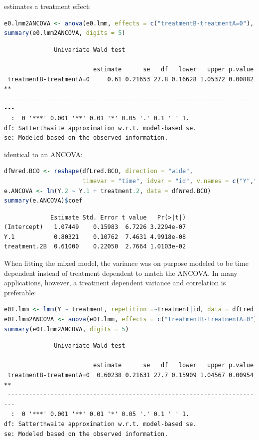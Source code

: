 \documentclass[12pt]{article}
\newcommand\Warning[1][3ex]{%
\renewcommand\stacktype{L}%
\scaleto{\stackon[1.3pt]{\color{red}$\triangle$}{\tiny\bfseries !}}{#1}%
\xspace
}
\begin{document}
estimates a treatment effect:
\begin{lstlisting}[language=r,numbers=none]
e0.lmm2ANCOVA <- anova(e0.lmm, effects = c("treatmentB-treatmentA=0"), multivariate=FALSE)
summary(e0.lmm2ANCOVA, digits = 5)
\end{lstlisting}

\label{}
\begin{verbatim}
              Univariate Wald test 

                         estimate      se   df   lower   upper p.value   
 treatmentB-treatmentA=0     0.61 0.21653 27.8 0.16628 1.05372 0.00882 **
 ------------------------------------------------------------------------ 
  :  0 '***' 0.001 '**' 0.01 '*' 0.05 '.' 0.1 ' ' 1.
df: Satterthwaite approximation w.r.t. model-based se. 
se: Modeled based on the observed information.
\end{verbatim}


identical to an ANCOVA:
\begin{lstlisting}[language=r,numbers=none]
dfWred.BCO <- reshape(dfLred.BCO, direction = "wide",
                      timevar = "time", idvar = "id", v.names = c("Y","treatment"))
e.ANCOVA <- lm(Y.2 ~ Y.1 + treatment.2, data = dfWred.BCO)
summary(e.ANCOVA)$coef
\end{lstlisting}

\label{}
\begin{verbatim}
             Estimate Std. Error t value   Pr(>|t|)
(Intercept)   1.07449    0.15983  6.7226 3.2294e-07
Y.1           0.80321    0.10762  7.4631 4.9918e-08
treatment.2B  0.61000    0.22050  2.7664 1.0103e-02
\end{verbatim}


\Warning When fitting the mixed model, the variance was on purpose
modeled to be time dependent instead of treatment dependent to match
the ANCOVA. In many applications, however, a treatment dependent
variance and correlation is preferable:
\begin{lstlisting}[language=r,numbers=none]
e0T.lmm <- lmm(Y ~ treatment, repetition =~treatment|id, data = dfLred.BCO)
e0T.lmm2ANCOVA <- anova(e0T.lmm, effects = c("treatmentB-treatmentA=0"), multivariate=FALSE)
summary(e0T.lmm2ANCOVA, digits = 5)
\end{lstlisting}

\label{}
\begin{verbatim}
              Univariate Wald test 

                         estimate      se   df   lower   upper p.value   
 treatmentB-treatmentA=0  0.60238 0.21631 27.7 0.15909 1.04567 0.00954 **
 ------------------------------------------------------------------------ 
  :  0 '***' 0.001 '**' 0.01 '*' 0.05 '.' 0.1 ' ' 1.
df: Satterthwaite approximation w.r.t. model-based se. 
se: Modeled based on the observed information.
\end{verbatim}
\end{document}
